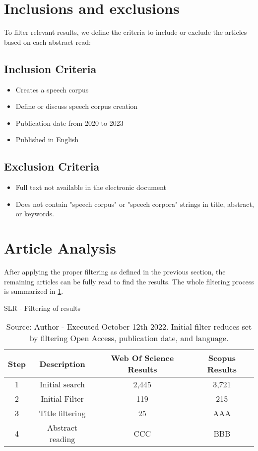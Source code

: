 \section{Inclusions and exclusions}

To filter relevant results, we define the criteria to include or exclude the articles based on each abstract read:

\subsection*{Inclusion Criteria}

\begin{itemize}
    \item Creates a speech corpus
    \item Define or discuss speech corpus creation
    \item Publication date from 2020 to 2023
    \item Published in English
\end{itemize}

\subsection*{Exclusion Criteria}

\begin{itemize}
    \item Full text not available in the electronic document
    \item Does not contain "speech corpus" or "speech corpora" strings in title, abstract, or keywords.
\end{itemize}

\section{Article Analysis}

After applying the proper filtering as defined in the previous section, the remaining articles can be fully read to find the results. The whole filtering process is summarized in \ref{tab:slr-filtering}.

\begin{table}[ht]
    \centering
    \caption{SLR - Filtering of results}
    \begin{tabular}{|c|c|c|c|}
        \hline 
        Step & Description & Web Of Science Results & Scopus Results \\ \hline
        1 & Initial search & 2,445 & 3,721 \\ \hline
        2 & Initial Filter & 119 & 215 \\ \hline
        3 & Title filtering & 25 & AAA\\ \hline
        4 & Abstract reading & CCC & BBB \\ \hline
    \end{tabular}
    \caption*{Source: Author - Executed October 12th 2022. Initial filter reduces set by filtering Open Access, publication date, and language.}
    \label{tab:slr-filtering}
\end{table}

